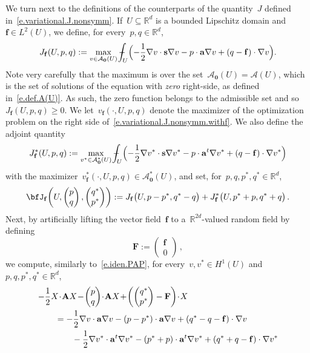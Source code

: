 \documentclass[11pt,twoside]{article} %
\numberwithin{equation}{section}
\theoremstyle{definition}
\newcommand*{\R}{\ensuremath{\mathbb{R}}}
\newcommand*{\Rd}{\ensuremath{\mathbb{R}^d}}
\newcommand{\f}{\mathbf{f}}
\newcommand{\s}{\mathbf{s}}
\renewcommand{\a}{\mathbf{a}}
\newcommand{\bfzero}{\boldsymbol{0}}
\def\Xint#1{\mathchoice
{\XXint\displaystyle\textstyle{#1}}%
{\XXint\textstyle\scriptstyle{#1}}%
{\XXint\scriptstyle\scriptscriptstyle{#1}}%
{\XXint\scriptscriptstyle\scriptscriptstyle{#1}}%
\!\int}
\def\XXint#1#2#3{{\setbox0=\hbox{$#1{#2#3}{\int}$}
\vcenter{\hbox{$#2#3$}}\kern-.5\wd0}}
\def\fint{\Xint-}
\newcommand{\A}{\mathcal{A}}
\newcommand{\bfA}{\mathbf{A}}
\newcommand{\bfF}{\mathbf{F}}
\begin{document}
We turn next to the definitions of the counterparts of the quantity~$J$ defined in~\eqref{e.variational.J.nonsymm}. If~$U\subseteq\Rd$ is a bounded Lipschitz domain and~$\f \in L^2(U)$, we define, for every~$p,q\in\Rd$, 
\begin{equation}
\label{e.variational.J.nonsymm.withf}
J_{\f} (U,p,q) 
:= 
\max_{v\in \mathcal{A}_{\bfzero} (U)} 
\fint_U \Bigl( -\frac12 \nabla v\cdot \s\nabla v -p\cdot \a\nabla v   + (q-\f)\cdot \nabla v \Bigr).
\end{equation}
Note very carefully that the maximum is over the set~$\A_{\bfzero}(U) = \A(U)$, which is the set of solutions of the equation with \emph{zero} right-side, as defined in~\eqref{e.def.A(U)}. 
As such, the zero function belongs to the admissible set and so~$J_{\f}(U,p,q) \geq 0$. We let~$v_{\f}(\cdot,U,p,q)$ denote the maximizer of the optimization problem on the right side of~\eqref{e.variational.J.nonsymm.withf}. We also define the adjoint quantity 
\begin{equation}
\label{e.variational.J.nonsymm.dual.withf}
J^*_{\f}(U,p,q) 
:= 
\max_{v^*\in \mathcal{A}_{\bfzero}^*(U)} 
\fint_U \Bigl( -\frac12 \nabla v^*\cdot \s\nabla v^* -p\cdot \a^t\nabla v^* + (q-\f)\cdot \nabla v^*   \Bigr) 
\end{equation}
with the maximizer~$v_{\f}^*(\cdot,U,p,q) \in \mathcal{A}_{\bfzero}^*(U)$,
and set, for~$p,q,p^*,q^* \in \Rd$, 
\begin{equation}
\label{e.bfJ.withf}
\bfJ_{\f}
\biggl(U, \begin{pmatrix} p  \\ q \end{pmatrix}, \begin{pmatrix} q^* \\ p^* \end{pmatrix} \biggr)
:=
J_{\f}\bigl(U,p-p^*,q^*-q\bigr)
+ 
J^*_{\f}\bigl(U,p^*+p,q^*+q\bigr)
\,.
\end{equation}
Next, by artificially lifting the vector field~$\f$ to a~$\R^{2d}$-valued random field by defining
\begin{equation*}
\bfF:=
\begin{pmatrix} \f  \\  0 \end{pmatrix}
\,,
\end{equation*}
we compute, similarly to~\eqref{e.iden.PAP}, for every~$v,v^*\in H^1(U)$ and~$p,q,p^*,q^*\in\Rd$, 
\begin{align}
\label{e.iden.PAP.again}
& 
{-}\frac12  X 
\!\cdot\!
\bfA 
X
\! - \!
\begin{pmatrix} p \\ q \end{pmatrix} 
\!\cdot\!
\bfA
X
\! + \!
\biggl( \begin{pmatrix} q^* \\ p^* \end{pmatrix} - \mathbf{F} \biggr)
\!\cdot\!
X
\notag \\ & \qquad
=
- \frac12 \nabla v \cdot \a\nabla v 
- (p-p^*)\cdot \a\nabla v
+(q^*-q - \f )\cdot \nabla v
\notag \\ & \qquad \qquad
- \frac12 \nabla v^* \cdot \a^t \nabla v^*
-(p^*+p)\cdot\a^t\nabla v^* 
+(q^*+q- \f)\cdot \nabla v^*
\end{align}
\end{document}
